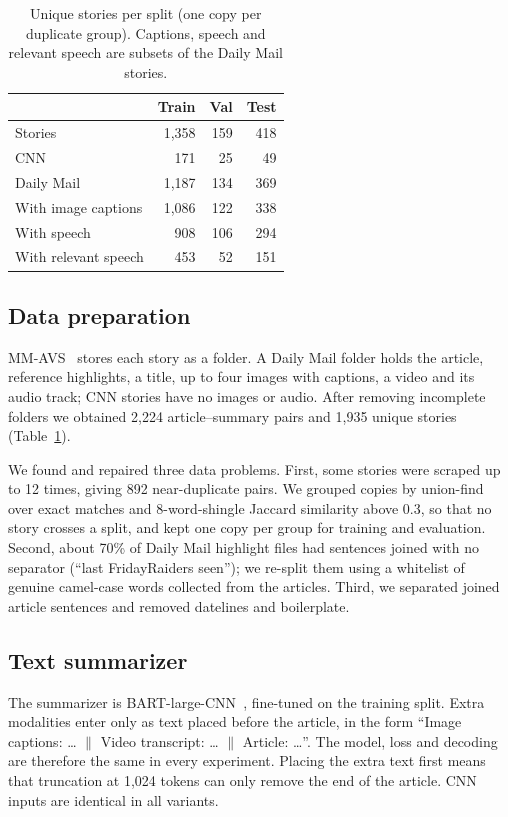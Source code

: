 \documentclass[conference]{IEEEtran}
\begin{document}
\begin{table}[t]
\caption{Unique stories per split (one copy per duplicate group). Captions, speech and relevant speech are subsets of the Daily Mail stories.}
\label{tab:data}
\centering
\begin{tabular}{lrrr}
\toprule
 & Train & Val & Test \\
\midrule
Stories               & 1{,}358 & 159 & 418 \\
\quad CNN             & 171 & 25 & 49 \\
\quad Daily Mail      & 1{,}187 & 134 & 369 \\
With image captions   & 1{,}086 & 122 & 338 \\
With speech           & 908 & 106 & 294 \\
With relevant speech  & 453 & 52 & 151 \\
\bottomrule
\end{tabular}
\end{table}

\subsection{Data preparation}
MM-AVS~\cite{fu2021mmavs} stores each story as a folder. A Daily Mail folder holds the article, reference highlights, a title, up to four images with captions, a video and its audio track; CNN stories have no images or audio. After removing incomplete folders we obtained 2{,}224 article--summary pairs and 1{,}935 unique stories (Table~\ref{tab:data}).

We found and repaired three data problems. First, some stories were scraped up to 12 times, giving 892 near-duplicate pairs. We grouped copies by union-find over exact matches and 8-word-shingle Jaccard similarity above 0.3, so that no story crosses a split, and kept one copy per group for training and evaluation. Second, about 70\% of Daily Mail highlight files had sentences joined with no separator (``last FridayRaiders seen''); we re-split them using a whitelist of genuine camel-case words collected from the articles. Third, we separated joined article sentences and removed datelines and boilerplate.

\subsection{Text summarizer}
The summarizer is BART-large-CNN~\cite{lewis2020bart}, fine-tuned on the training split. Extra modalities enter only as text placed before the article, in the form ``Image captions: \ldots{} $\|$ Video transcript: \ldots{} $\|$ Article: \ldots''. The model, loss and decoding are therefore the same in every experiment. Placing the extra text first means that truncation at 1{,}024 tokens can only remove the end of the article. CNN inputs are identical in all variants.
\end{document}
